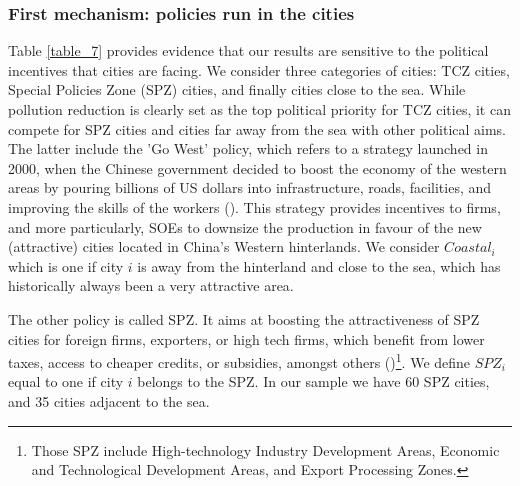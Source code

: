 \documentclass[12pt]{article}
\begin{document}
\subsubsection{First mechanism: policies run in the cities}



Table \ref{table_7} provides evidence that our results are sensitive to the political incentives that cities are facing. We consider three categories of cities: TCZ cities, Special Policies Zone (SPZ) cities, and finally cities close to the sea. While pollution reduction is clearly set as the top political priority for TCZ cities, it can compete for SPZ cities and cities far away from the sea with other political aims. The latter include the 'Go West' policy, which refers to a strategy launched in 2000, when the Chinese government decided to boost the economy of the western areas by pouring billions of US dollars into infrastructure, roads, facilities, and improving the skills of the workers (\cite{Chen2018-ki}). This strategy provides incentives to firms, and more particularly, SOEs to downsize the production in favour of the new (attractive) cities located in China's Western hinterlands. We consider $Coastal_i$ which is one if city $i$ is away from the hinterland and close to the sea, which has historically always been a very attractive area.


The other policy is called SPZ. It aims at boosting the attractiveness of SPZ cities for foreign firms, exporters, or high tech firms, which benefit from lower taxes, access to cheaper credits, or subsidies, amongst others (\cite{Wang2008-gv,Hering2014-af})\footnote{ Those SPZ include High-technology Industry Development Areas, Economic and Technological Development Areas, and Export Processing Zones.}. We define $SPZ_i$ equal to one if city $i$ belongs to the SPZ. In our sample we have 60 SPZ cities, and 35 cities adjacent to the sea.
 
\end{document}
